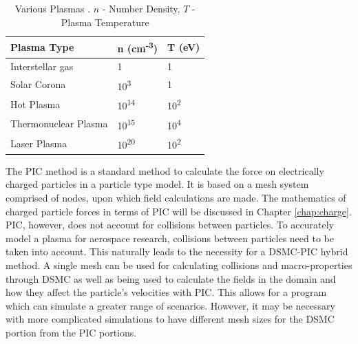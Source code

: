 \begin{table}
\caption[Various Plasmas]{Various Plasmas \cite{plasma_table}. \(n\) - Number Density, \(T\) - Plasma Temperature}
\label{tab:plasma}
\vspace{0.3cm}
\begin{center}
\begin{tabular}{|lll|}
\hline
Plasma Type          & n (cm\textsuperscript{-3}) & T (eV)                  \\ \hline
Interstellar gas     & 1                        & 1                     \\
Solar Corona         & 10\textsuperscript{3}    & 1                     \\
Hot Plasma           & 10\textsuperscript{14}   & 10\textsuperscript{2} \\
Thermonuclear Plasma & 10\textsuperscript{15}   & 10\textsuperscript{4} \\
Laser Plasma         & 10\textsuperscript{20}   & 10\textsuperscript{2} \\ \hline
\end{tabular}
\end{center}
\end{table}

\indent The PIC method is a standard method to calculate the force on electrically charged particles in a particle type model. It is based on a mesh system comprised of nodes, upon which field calculations are made. The mathematics of charged particle forces in terms of PIC will be discussed in Chapter \ref{chap:charge}. PIC, however, does not account for collisions between particles. To accurately model a plasma for aerospace research, collisions between particles need to be taken into account. This naturally leads to the necessity for a DSMC-PIC hybrid method. A single mesh can be used for calculating collisions and macro-properties through DSMC as well as being used to calculate the fields in the domain and how they affect the particle's velocities with PIC. This allows for a program which can simulate a greater range of scenarios. However, it may be necessary with more complicated simulations to have different mesh sizes for the DSMC portion from the PIC portions. \par


